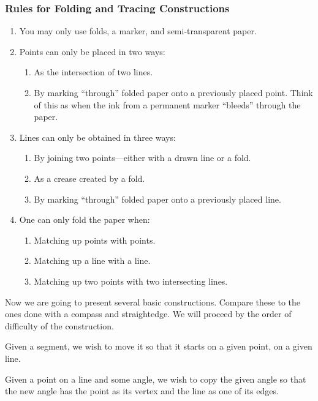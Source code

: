 \subsubsection{Rules for Folding and Tracing Constructions}
\begin{enumerate}
\item You may only use folds, a marker, and semi-transparent paper.
\item Points can only be placed in two ways:
\begin{enumerate}
\item As the intersection of two lines. 
\item By marking ``through'' folded paper onto a previously placed
  point. Think of this as when the ink from a permanent marker
  ``bleeds'' through the paper.
\end{enumerate}
\item Lines can only be obtained in three ways:
\begin{enumerate}
\item By joining two points---either with a drawn line or a fold.
\item As a crease created by a fold. 
\item By marking ``through'' folded paper onto a previously placed
  line.
\end{enumerate}
\item One can only fold the paper when:
\begin{enumerate}
\item Matching up points with points.
\item Matching up a line with a line.
\item Matching up two points with two intersecting lines.
\end{enumerate}
\end{enumerate}


Now we are going to present several basic constructions. Compare these
to the ones done with a compass and straightedge. We will proceed by
the order of difficulty of the construction.


\begin{construction}  
Given a segment, we wish to move it so that it starts on a given
point, on a given line.
\end{construction}


\begin{construction} 
Given a point on a line and some angle, we wish to copy the given
angle so that the new angle has the point as its vertex and the line
as one of its edges.
\end{construction}

